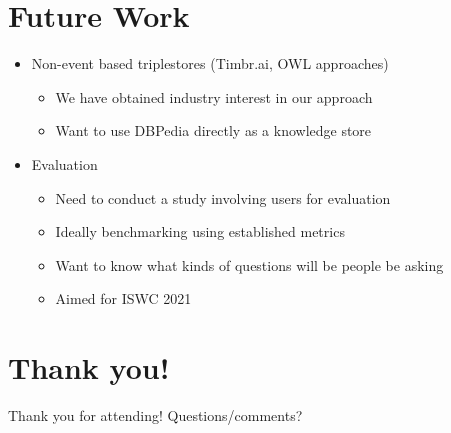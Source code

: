 \documentclass[logoontitle,tabu,supertabular,aspectratio=43]{preney-uwindsor-beamer}
\begin{document}
	\section{Future Work}
	\begin{frame}{\insertsection}
		\begin{itemize}
            \item Non-event based triplestores (Timbr.ai, OWL approaches)
            \begin{itemize}
                \item We have obtained industry interest in our approach
                \item Want to use DBPedia directly as a knowledge store
            \end{itemize}
            \item Evaluation
            \begin{itemize}
                \item Need to conduct a study involving users for evaluation
                \item Ideally benchmarking using established metrics
                \item Want to know what kinds of questions will be people be asking
                \item Aimed for ISWC 2021
            \end{itemize}
		\end{itemize}
	\end{frame}


	\section*{Thank you!}
	\begin{frame}
		\begin{center}
			\huge Thank you for attending!  Questions/comments?
		\end{center}
	\end{frame}

%
%
%
\end{document}
